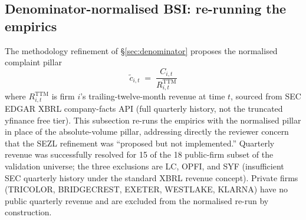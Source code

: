 \documentclass[11pt,a4paper]{article}
\begin{document}
\subsection{Denominator-normalised BSI: re-running the empirics}\label{sec:results_normalised}

The methodology refinement of §\ref{sec:denominator} proposes the normalised complaint pillar
\[
\widetilde{c}_{i,t} \;=\; \frac{C_{i,t}}{R_{i,t}^{\text{TTM}}}
\]
where $R_{i,t}^{\text{TTM}}$ is firm $i$'s trailing-twelve-month revenue at time $t$, sourced from SEC EDGAR XBRL company-facts API (full quarterly history, not the truncated yfinance free tier). This subsection re-runs the empirics with the normalised pillar in place of the absolute-volume pillar, addressing directly the reviewer concern that the SEZL refinement was ``proposed but not implemented.'' Quarterly revenue was successfully resolved for 15 of the 18 public-firm subset of the validation universe; the three exclusions are LC, OPFI, and SYF (insufficient SEC quarterly history under the standard XBRL revenue concept). Private firms (TRICOLOR, BRIDGECREST, EXETER, WESTLAKE, KLARNA) have no public quarterly revenue and are excluded from the normalised re-run by construction.

\begin{table}[h]
\centering\small
{}
\caption{Panel regression of forward log-volume change on the absolute and normalised BSI pillars across 13 firms with full SEC-quarterly revenue history (972 firm-months, cluster-robust SE clustered by firm, 12 firm-FE dummies). Specification C is the reviewer's direct test: \emph{is the BSI signal statistically distinguishable from a revenue-growth proxy?} The normalised BSI lag-1 coefficient remains highly significant ($p < 0.001$) when revenue YoY is included as a separate control, and revenue YoY itself does not reach significance ($p = 0.103$) --- demonstrating that the normalised signal carries information independent of the firm's revenue-growth trajectory. Source: \texttt{empirics\_v2/out/v2/normalised\_panel.csv}.}\label{tab:normalised_panel}
\end{table}
\end{document}
